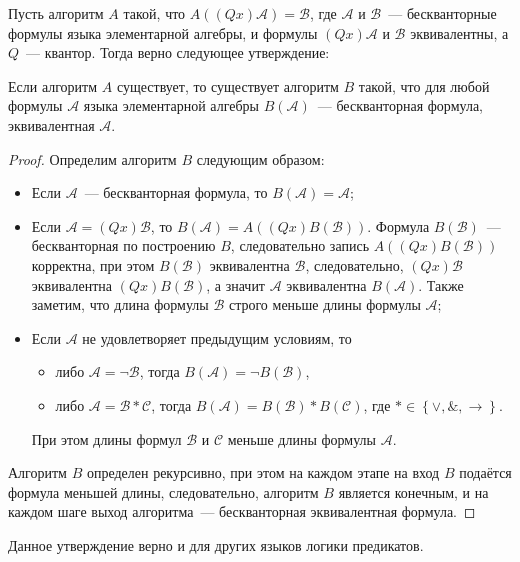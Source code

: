 Пусть алгоритм $A$ такой, что $A\left(\left(Qx\right)\mathcal{A}\right) = \mathcal{B}$, где $\mathcal{A}$ и $\mathcal{B}$~--- бескванторные формулы языка элементарной алгебры, и формулы $(Qx)\mathcal{A}$ и $\mathcal{B}$ эквивалентны, а $Q$~--- квантор. Тогда верно следующее утверждение:
\begin{proposal}\label{algB}
    Если алгоритм $A$ существует, то существует алгоритм $B$ такой, что для любой формулы $\mathcal{A}$ языка элементарной алгебры $B\left(\mathcal{A}\right)$~--- бескванторная формула, эквивалентная $\mathcal{A}$.
\end{proposal}   
\begin{proof}
    Определим алгоритм $B$ следующим образом:
    \begin{itemize}
        \item Если $\mathcal{A}$~--- бескванторная формула, то $B\left(\mathcal{A}\right) = \mathcal{A}$;
        \item Если $\mathcal{A} = \left(Qx\right)\mathcal{B}$, то $B\left(\mathcal{A}\right) = A\left(\left(Qx\right)B\left(\mathcal{B}\right)\right)$. Формула $B\left(\mathcal{B}\right)$~--- бескванторная по построению $B$, следовательно запись $A\left(\left(Qx\right)B\left(\mathcal{B}\right)\right)$ корректна, при этом $B\left(\mathcal{B}\right)$ эквивалентна $\mathcal{B}$, следовательно, $\left(Qx\right)\mathcal{B}$ эквивалентна $\left(Qx\right)B\left(\mathcal{B}\right)$, а значит $\mathcal{A}$ эквивалентна $B\left(\mathcal{A}\right)$. Также заметим, что длина формулы $\mathcal{B}$ строго меньше длины формулы $\mathcal{A}$;
        \item Если $\mathcal{A}$ не удовлетворяет предыдущим условиям, то
        \begin{itemize}
            \item либо $\mathcal{A} = \lnot \mathcal{B}$, тогда $B\left(\mathcal{A}\right) = \lnot B\left(\mathcal{B}\right)$,
            \item либо $\mathcal{A} = \mathcal{B} * \mathcal{C}$, тогда $B\left(\mathcal{A}\right) = B\left(\mathcal{B}\right) * B\left(\mathcal{C}\right)$, где $* \in \left\{\lor, \&, \to\right\}$.
        \end{itemize}
        При этом длины формул $\mathcal{B}$ и $\mathcal{C}$ меньше длины формулы $\mathcal{A}$.
    \end{itemize}
    Алгоритм $B$ определен рекурсивно, при этом на каждом этапе на вход $B$ подаётся формула меньшей длины, следовательно, алгоритм $B$ является конечным, и на каждом шаге выход алгоритма~--- бескванторная эквивалентная формула.
\end{proof} 
\begin{remark}
    Данное утверждение верно и для других языков логики предикатов.
\end{remark}

